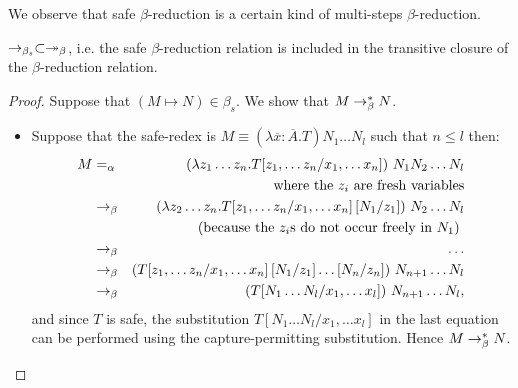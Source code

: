 We observe that safe $\beta$-reduction is a certain kind of multi-steps $\beta$-reduction.
\begin{property}
$\rightarrow_{\beta_s} \subset \twoheadrightarrow_\beta$, i.e. the safe
$\beta$-reduction relation is included in the transitive closure of the $\beta$-reduction relation.
\end{property}
\begin{proof}
Suppose that $(M\mapsto N) \in \beta_s$. We show that $M \rightarrow_\beta^* N$.
\begin{itemize}
\item Suppose that the safe-redex is
$M \equiv (\lambda \overline{x} : \overline{A} . T) N_1 \ldots N_l$ such that $n\leq l$ then:
\begin{eqnarray*}
 M &=_\alpha& (\lambda z_1 \ldots z_n .T [z_1,\ldots z_n /x_1,\ldots x_n] ) \ N_1  N_2 \ldots N_l
            \\
&& \mbox{where the $z_i$ are fresh variables}  \\
     &\rightarrow_\beta& (\lambda z_2 \ldots z_n .T [z_1,\ldots z_n /x_1,\ldots x_n] \left[ N_1/z_1 \right] ) \ N_2 \ldots N_l \\
&& \mbox{ (because the $z_i$s do not occur freely in $N_1$) }\\
    &\rightarrow_\beta& \ldots \\
    &\rightarrow_\beta& (T [z_1,\ldots z_n /x_1,\ldots x_n] \left[ N_1/z_1 \right]  \ldots \left[ N_n/z_n \right])\  N_{n+1} \ldots N_l \\
    &\rightarrow_\beta& (T [N_1\ldots N_l/x_1,\ldots x_l])\ N_{n+1} \ldots
    N_l,
\end{eqnarray*}
and since $T$ is safe, the substitution $T [N_1\ldots N_l/x_1,\ldots
x_l]$ in the last equation can be performed using the
capture-permitting substitution. Hence $M \rightarrow_\beta^* N$.


\end{itemize}
\end{proof}
